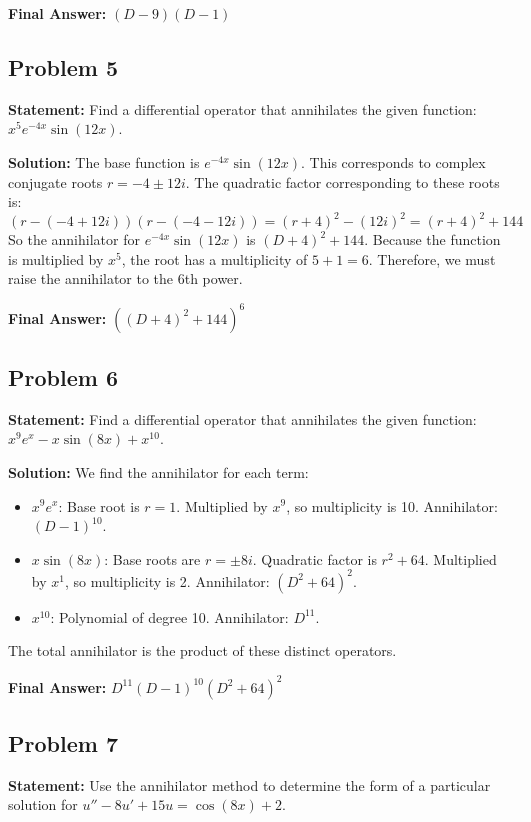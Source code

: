 \documentclass[11pt, a4paper]{article}
\theoremstyle{definition}
\theoremstyle{remark}
\begin{document}
\textbf{Final Answer:} $(D-9)(D-1)$

\vspace{1em}
\subsection*{Problem 5}
\textbf{Statement:} Find a differential operator that annihilates the given function: $x^5 e^{-4x} \sin(12x)$.

\textbf{Solution:}
The base function is $e^{-4x} \sin(12x)$. This corresponds to complex conjugate roots $r = -4 \pm 12i$.
The quadratic factor corresponding to these roots is:
\[
(r - (-4 + 12i))(r - (-4 - 12i)) = (r+4)^2 - (12i)^2 = (r+4)^2 + 144
\]
So the annihilator for $e^{-4x} \sin(12x)$ is $(D+4)^2 + 144$.
Because the function is multiplied by $x^5$, the root has a multiplicity of $5 + 1 = 6$. Therefore, we must raise the annihilator to the 6th power.

\textbf{Final Answer:} $\left((D+4)^2 + 144\right)^6$

\vspace{1em}
\subsection*{Problem 6}
\textbf{Statement:} Find a differential operator that annihilates the given function: $x^9 e^x - x \sin(8x) + x^{10}$.

\textbf{Solution:}
We find the annihilator for each term:
\begin{itemize}
    \item $x^9 e^x$: Base root is $r=1$. Multiplied by $x^9$, so multiplicity is 10. Annihilator: $(D-1)^{10}$.
    \item $x \sin(8x)$: Base roots are $r = \pm 8i$. Quadratic factor is $r^2 + 64$. Multiplied by $x^1$, so multiplicity is 2. Annihilator: $(D^2 + 64)^2$.
    \item $x^{10}$: Polynomial of degree 10. Annihilator: $D^{11}$.
\end{itemize}
The total annihilator is the product of these distinct operators.

\textbf{Final Answer:} $D^{11}(D-1)^{10}(D^2 + 64)^2$

\vspace{1em}
\subsection*{Problem 7}
\textbf{Statement:} Use the annihilator method to determine the form of a particular solution for $u'' - 8u' + 15u = \cos(8x) + 2$.
\end{document}

